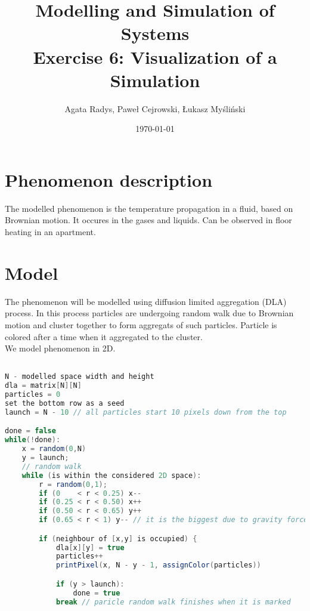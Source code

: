 \documentclass[a4paper,10pt]{article}
\title{Modelling and Simulation of Systems\\ \Large
Exercise 6: Visualization of a Simulation}
\author{Agata Radys, Paweł Cejrowski, Łukasz Myśliński}
\date{\today}
\begin{document}
\maketitle

\section*{Phenomenon description}
The modelled phenomenon is the temperature propagation in a fluid, based on Brownian motion. It occures in the gases and
liquids. Can be observed in floor heating in an apartment.
\section*{Model}
The phenomenon will be modelled using diffusion limited aggregation (DLA) process. In this process particles are undergoing
random walk due to Brownian motion and cluster together to form aggregats of such particles. Particle is colored after a time
when it aggregated to the cluster.
\\
We model phenomenon in 2D.


\begin{lstlisting}[language=java,caption={Algorithm for generating consecutive steps}]

N - modelled space width and height
dla = matrix[N][N]
particles = 0
set the bottom row as a seed
launch = N - 10 // all particles start 10 pixels down from the top

done = false
while(!done):
    x = random(0,N)
    y = launch;
    // random walk
    while (is within the considered 2D space):
        r = random(0,1);
        if (0    < r < 0.25) x--
        if (0.25 < r < 0.50) x++
        if (0.50 < r < 0.65) y++
        if (0.65 < r < 1) y-- // it is the biggest due to gravity force

        if (neighbour of [x,y] is occupied) {
            dla[x][y] = true
            particles++
            printPixel(x, N - y - 1, assignColor(particles))

            if (y > launch):
                done = true
            break // paricle random walk finishes when it is marked
\end{lstlisting}
\end{document}
